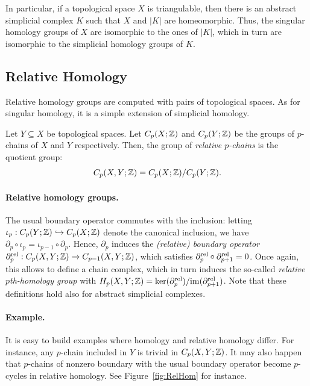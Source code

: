 In particular, if a topological space $X$ is triangulable, then there is an abstract simplicial complex $K$ such that
$X$ and $|K|$ are homeomorphic. Thus, the singular homology groups of $X$ are isomorphic to the ones 
of $|K|$, which in turn are isomorphic to the simplicial homology groups of $K$. 

\subsection{Relative Homology}\label{sec:relHomo}

Relative homology groups are computed with pairs of topological spaces.
As for singular homology, it is a simple extension of simplicial homology.

\begin{defin}
Let $Y\subseteq X$ be topological spaces. Let $C_p(X;\mathbb{Z})$ and $C_p(Y;\mathbb{Z})$ be the groups of
$p$-chains of $X$ and $Y$ respectively. Then, the group of {\em relative $p$-chains} is the
quotient group: $$C_p(X,Y;\mathbb{Z})=C_p(X;\mathbb{Z})/C_p(Y;\mathbb{Z}).$$
\end{defin} 

\paragraph*{Relative homology groups.} The usual boundary operator commutes with the inclusion:
letting $\iota_p:C_p(Y;\mathbb{Z})\hookrightarrow C_p(X;\mathbb{Z})$ denote the canonical inclusion, we have
$\partial_p\circ\iota_p = \iota_{p-1}\circ\partial_p$.
Hence, $\partial_p$ induces the
{\em (relative) boundary operator} $\partial^{\rm rel}_p:C_p(X,Y;\mathbb{Z})\rightarrow C_{p-1}(X,Y;\mathbb{Z})$, 
which satisfies $\partial^{\rm rel}_{p}\circ\partial^{\rm rel}_{p+1}=0$. Once again, this allows to define
a chain complex, which in turn induces the so-called {\em relative $p$th-homology group} with $H_p(X,Y;\mathbb{Z})=\ker(\partial^{\rm rel}_p)/\mathrm{im}(\partial^{\rm rel}_{p+1})$.  Note
that these definitions hold also for abstract simplicial complexes.

\paragraph*{Example.} It is easy to build examples where homology and relative homology differ.
For instance, any $p$-chain included in $Y$ is trivial in $C_p(X,Y;\mathbb{Z})$. It may also happen
that $p$-chains of nonzero boundary with the usual boundary operator become $p$-cycles in relative homology.
See Figure~\ref{fig:RelHom} for instance.


